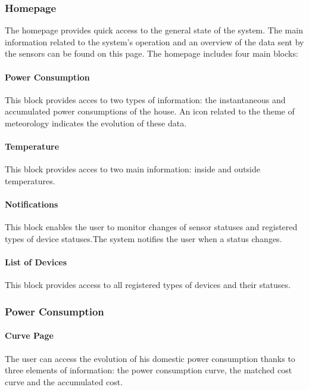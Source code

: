      
\subsubsection{Homepage}

The homepage provides quick access to the general state of the system.
The main information related to the system's operation and an overview of the data sent by the sensors can be found on this page.
The homepage includes four main blocks:%
    \paragraph{Power Consumption} 
    This block provides acces to two types of information: the instantaneous and accumulated power consumptions of the house. An icon related to the theme of meteorology indicates the evolution of these data. %
    \paragraph{Temperature}
    This block provides acces to two main information: inside and outside temperatures.
    \paragraph{Notifications}
    This block enables the user to monitor changes of sensor statuses and registered types of device statuses.The system notifies the user when a status changes.
    \paragraph{List of Devices} %
    This block provides access to all registered types of devices and their statuses.

\subsubsection{Power Consumption}

    \paragraph{Curve Page}
    The user can access the evolution of his domestic power consumption thanks to three elements of information: the power consumption curve, the matched cost curve and the accumulated cost.
    
